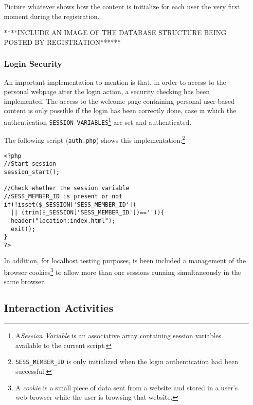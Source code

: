 \documentclass{acm_proc_article-sp}
\begin{document}
Picture whatever shows how the content is initialize for each user the very first moment during the registration. 

****INCLUDE AN IMAGE OF THE DATABASE STRUCTURE BEING POSTED BY REGISTRATION******

\subsubsection{Login Security}

An important implementation to mention is that, in order to access to the personal webpage after the login action, a security checking has been implemented. The access to the welcome page containing personal user-based content is only possible if the login has been correctly done, case in which the authentication \texttt{SESSION VARIABLES}\footnote{A\textit{Session Variable} is an associative array containing session variables available to the current script.} are set and authenticated. 

The following script (\texttt{auth.php}) shows this implementation:\footnote{\texttt{SESS\_MEMBER\_ID} is only initialized when the login authentication had been successful.}

\begin{lstlisting}
<?php
//Start session
session_start();
	
//Check whether the session variable 
//SESS_MEMBER_ID is present or not
if(!isset($_SESSION['SESS_MEMBER_ID']) 
  || (trim($_SESSION['SESS_MEMBER_ID'])=='')){
  header("location:index.html");
  exit();
}
?>
\end{lstlisting}

In addition, for localhost testing purposes, is been included a management of the browser cookies\footnote{A \textit{cookie} is a small piece of data sent from a website and stored in a user's web browser while the user is browsing that website.} to allow more than one sessions running simultaneously in the same browser.

\subsection{Interaction Activities}
\end{document}
